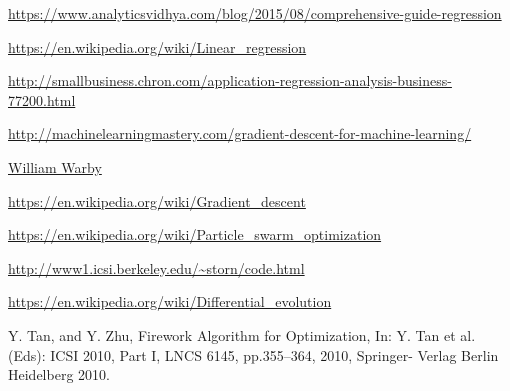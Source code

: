 \documentclass[11pt, a4paper]{report}
\begin{document}
\newpage
\begin{thebibliography}{50}
	
\url{https://www.analyticsvidhya.com/blog/2015/08/comprehensive-guide-regression}

\url{https://en.wikipedia.org/wiki/Linear_regression}

\url{http://smallbusiness.chron.com/application-regression-analysis-business-77200.html}

\url{http://machinelearningmastery.com/gradient-descent-for-machine-learning/}

\href{https://www.flickr.com/photos/wwarby/4046737583/}{William Warby}

\url{https://en.wikipedia.org/wiki/Gradient_descent}

\url{https://en.wikipedia.org/wiki/Particle_swarm_optimization}

\url{http://www1.icsi.berkeley.edu/~storn/code.html}

\url{https://en.wikipedia.org/wiki/Differential_evolution}

Y. Tan, and Y. Zhu, Firework Algorithm for Optimization, In: Y. Tan et
al.(Eds): ICSI 2010, Part I, LNCS 6145, pp.355–364, 2010, Springer-
Verlag Berlin Heidelberg 2010.

\end{thebibliography}
\end{document}
